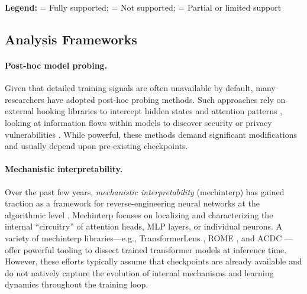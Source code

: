 {{\begin{table}[htbp]
\begin{tabular}{@{}p{2.6cm} p{1.8cm} p{2.6cm} p{2.4cm} p{2.0cm} p{2.3cm}@{}}
    \bottomrule
    \end{tabular}
    \vspace{0.5em}
    
    \raggedright
    \textbf{Legend:} \cmark = Fully supported; \xmark = Not supported; \warnmark = Partial or limited support
\end{table}
}



\subsection{Analysis Frameworks}

\paragraph{Post-hoc model probing.} Given that detailed training signals are often unavailable by default, many researchers have adopted post-hoc probing methods. Such approaches rely on external hooking libraries to intercept hidden states and attention patterns \cite{voita2019analyzing, clark2019does, michel2019sixteen}, looking at information flows within models to discover security or privacy vulnerabilities \cite{yao2024privacysurvey}. While powerful, these methods demand significant modifications and usually depend upon pre-existing checkpoints.%

\paragraph{Mechanistic interpretability.} Over the past few years, \emph{mechanistic interpretability} (mechinterp) has gained traction as a framework for reverse-engineering neural networks at the algorithmic level \cite{olah2020zoom, elhage2021mathematical}. Mechinterp focuses on localizing and characterizing the internal “circuitry” of attention heads, MLP layers, or individual neurons. A variety of mechinterp libraries—e.g., TransformerLens \cite{nanda2022transformerlens}, ROME \cite{meng2022locating}, and ACDC \cite{conmy2023towards}—offer powerful tooling to dissect trained transformer models at inference time. However, these efforts typically assume that checkpoints are already available and do not natively capture the evolution of internal mechanisms and learning dynamics throughout the training loop.

\vspace{-0.2cm}
}
